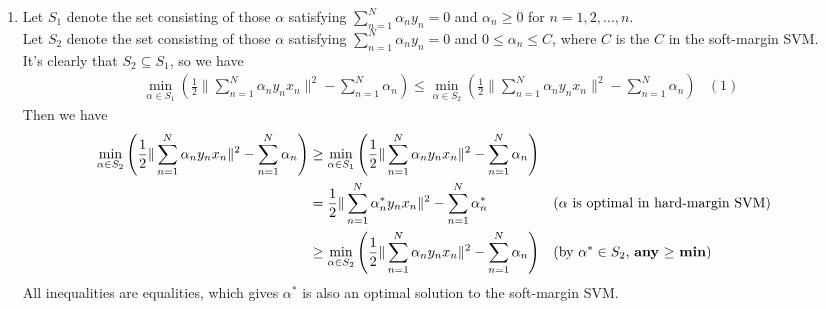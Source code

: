 \documentclass{article}
\begin{document}
\begin{CJK*}{UTF8}{bsmi}
\begin{normalsize}
\begin{enumerate}[label=\textbf{\arabic*}.]
        \item Let $S_1$ denote the set consisting of those $\alpha$ satisfying $\sum_{n=1}^N \alpha_n y_n = 0$ and $\alpha_n \ge 0$ for $n = 1, 2, \dots, n$.\\
        Let $S_2$ denote the set consisting of those $\alpha$ satisfying $\sum_{n=1}^N \alpha_n y_n = 0$ and $0 \le \alpha_n \le C$, where $C$ is the $C$ in the soft-margin SVM. \\
        It's clearly that $S_2 \subseteq S_1$, so we have
        \[\begin{aligned} \min_{\alpha\in S_1}\left(\frac{1}{2}\|\sum_{n=1}^N \alpha_n y_n x_n\|^2 - \sum_{n=1}^N \alpha_n\right) \le \min_{\alpha\in S_2}\left(\frac{1}{2}\|\sum_{n=1}^N \alpha_n y_n x_n\|^2 - \sum_{n=1}^N \alpha_n\right) & (1) \end{aligned}\]
        Then we have
        \[\begin{aligned}
        \min_{\alpha\in S_2}\left(\frac{1}{2}\|\sum_{n=1}^N \alpha_n y_n x_n\|^2 - \sum_{n=1}^N \alpha_n\right) &\ge \min_{\alpha\in S_1}\left(\frac{1}{2}\|\sum_{n=1}^N \alpha_n y_n x_n\|^2 - \sum_{n=1}^N \alpha_n\right)\\
        &= \frac{1}{2}\|\sum_{n=1}^N \alpha^*_n y_n x_n\|^2 - \sum_{n=1}^N \alpha^*_n &&\text{($\alpha$ is optimal in hard-margin SVM)}\\
        &\ge \min_{\alpha\in S_2}\left(\frac{1}{2}\|\sum_{n=1}^N \alpha_n y_n x_n\|^2 - \sum_{n=1}^N \alpha_n\right)&&\text{(by $\alpha^* \in S_2$, \textbf{any} $\ge$ \textbf{min})} \end{aligned}\]
        All inequalities are equalities, which gives $\alpha^*$ is also an optimal solution to the soft-margin SVM.
        

\end{enumerate}
\end{normalsize}
\end{CJK*}
\end{document}
